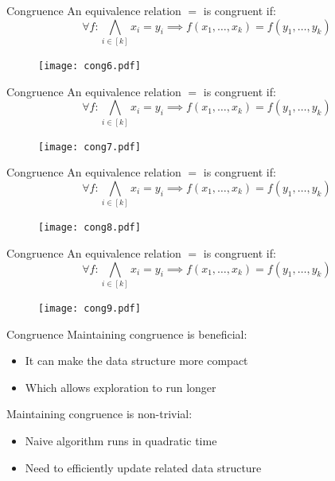 \documentclass{beamer}
\begin{document}
  \begin{frame}{Congruence}
    An equivalence relation $=$ is congruent if:
 \[\forall f : \bigwedge_{i \in [k]} x_i = y_i \implies
  f(x_1, \ldots, x_k) = f(y_1, \ldots, y_k)\] 
  \begin{figure}
    \texttt{[image: cong6.pdf]}
  \end{figure}
  \end{frame}

  \begin{frame}{Congruence}
    An equivalence relation $=$ is congruent if:
 \[\forall f : \bigwedge_{i \in [k]} x_i = y_i \implies
  f(x_1, \ldots, x_k) = f(y_1, \ldots, y_k)\] 
  \begin{figure}
    \texttt{[image: cong7.pdf]}
  \end{figure}
  \end{frame}

  \begin{frame}{Congruence}
    An equivalence relation $=$ is congruent if:
 \[\forall f : \bigwedge_{i \in [k]} x_i = y_i \implies
  f(x_1, \ldots, x_k) = f(y_1, \ldots, y_k)\] 
  \begin{figure}
    \texttt{[image: cong8.pdf]}
  \end{figure}
  \end{frame}

  \begin{frame}{Congruence}
    An equivalence relation $=$ is congruent if:
 \[\forall f : \bigwedge_{i \in [k]} x_i = y_i \implies
  f(x_1, \ldots, x_k) = f(y_1, \ldots, y_k)\] 
  \begin{figure}
    \texttt{[image: cong9.pdf]}
  \end{figure}
  \end{frame}

  \begin{frame}{Congruence}
    Maintaining congruence is beneficial:
    \begin{itemize}
      \item It can make the data structure more compact 
      \item Which allows exploration to run longer \pause
    \end{itemize}
    Maintaining congruence is non-trivial:
    \begin{itemize}
      \item Naive algorithm runs in quadratic time~\cite{cong} 
      \item Need to efficiently update related data structure
    \end{itemize}
  \end{frame}
\end{document}
